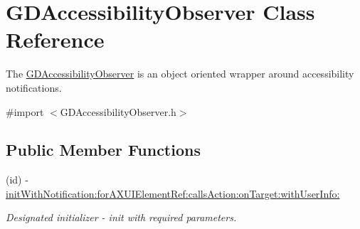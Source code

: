 \hypertarget{interface_g_d_accessibility_observer}{
\section{GDAccessibilityObserver Class Reference}
\label{interface_g_d_accessibility_observer}
}


The \hyperlink{interface_g_d_accessibility_observer}{GDAccessibilityObserver} is an object oriented wrapper around accessibility notifications.  


{\ttfamily \#import $<$GDAccessibilityObserver.h$>$}\subsection*{Public Member Functions}
\begin{DoxyCompactItemize}
\item 
(id) -\/ \hyperlink{interface_g_d_accessibility_observer_a38b7e5cbcdd5a9d4ff0e61fef5fede37}{initWithNotification:forAXUIElementRef:callsAction:onTarget:withUserInfo:}
\begin{DoxyCompactList}\small\item\em Designated initializer -\/ init with required parameters. \item\end{DoxyCompactList}\end{DoxyCompactItemize}
